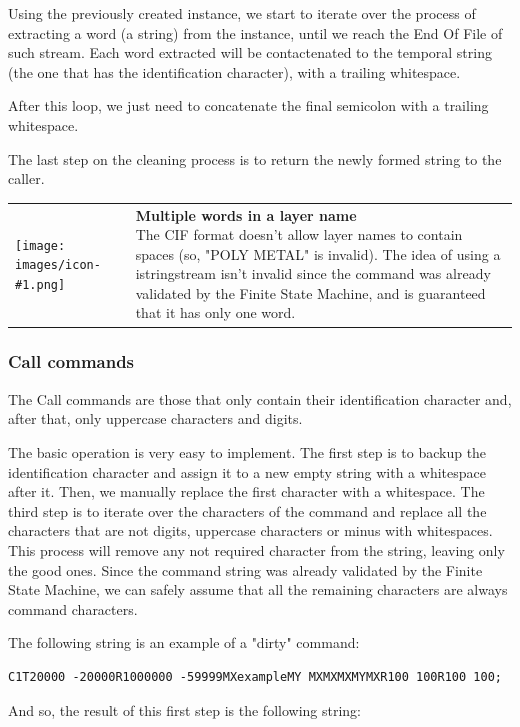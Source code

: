 \documentclass[11pt,twoside,openany,x11names,svgnames]{memoir}
\makeatletter
\newcommand{\IconNote}[3]
{
	\begin{table}[ht]
	\begin{tabular}{ lm{\dimexpr\textwidth-8\tabcolsep-\wd0}@{}}
		\toprule
		\texttt{[image: images/icon-\#1.png]}
		&
		\parbox[t]{155mm}{
		\textbf{#2} \\
		#3
		}
	\end{tabular}
\end{table}
}
\makeatother
\begin{document}
Using the previously created instance, we start to iterate over the process of extracting a word (a string) from the instance, until we reach the End Of File of such stream. Each word extracted will be contactenated to the temporal string (the one that has the identification character), with a trailing whitespace.

After this loop, we just need to concatenate the final semicolon with a trailing whitespace.

The last step on the cleaning process is to return the newly formed string to the caller.

\IconNote
	{info}
	{Multiple words in a layer name}
	{The CIF format doesn't allow layer names to contain spaces (so, "POLY METAL" is invalid). The idea of using a istringstream isn't invalid since the command was already validated by the Finite State Machine, and is guaranteed that it has only one word.}

\subsubsection{Call commands}\label{Call-commands}

The Call commands are those that only contain their identification character and, after that, only uppercase characters and digits.

The basic operation is very easy to implement. The first step is to backup the identification character and assign it to a new empty string with a whitespace after it. Then, we manually replace the first character with a whitespace. The third step is to iterate over the characters of the command and replace all the characters that are not digits, uppercase characters or minus with whitespaces. This process will remove any not required character from the string, leaving only the good ones. Since the command string was already validated by the Finite State Machine, we can safely assume that all the remaining characters are always command characters.

The following string is an example of a "dirty" command:

\begin{verbatim}
C1T20000 -20000R1000000 -59999MXexampleMY MXMXMXMYMXR100 100R100 100;
\end{verbatim}

And so, the result of this first step is the following string:
\end{document}
